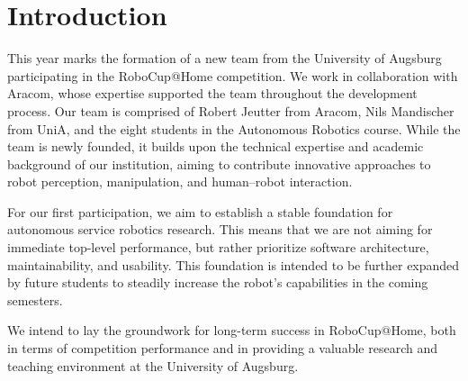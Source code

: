 \section{Introduction}
This year marks the formation of a new team from the University of Augsburg participating in the RoboCup@Home competition. We work in collaboration with Aracom, whose expertise supported the team throughout the development process. Our team is comprised of Robert Jeutter from Aracom, Nils Mandischer from UniA, and the eight students in the Autonomous Robotics course. While the team is newly founded, it builds upon the technical expertise and academic background of our institution, aiming to contribute innovative approaches to robot perception, manipulation, and human–robot interaction.

For our first participation, we aim to establish a stable foundation for autonomous service robotics research. This means that we are not aiming for immediate top-level performance, but rather prioritize software architecture, maintainability, and usability. This foundation is intended to be further expanded by future students to steadily increase the robot's capabilities in the coming semesters.

We intend to lay the groundwork for long-term success in RoboCup@Home, both in terms of competition performance and in providing a valuable research and teaching environment at the University of Augsburg.
